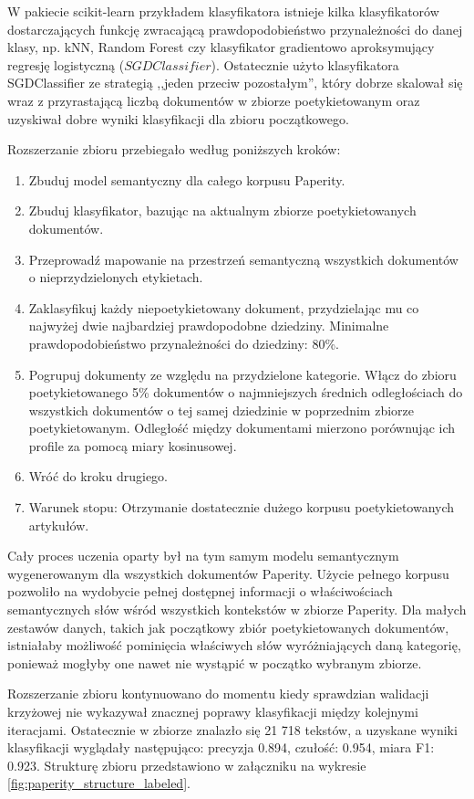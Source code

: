 \documentclass{pracamgr}
\begin{document}
W pakiecie scikit-learn przykładem klasyfikatora istnieje kilka klasyfikatorów dostarczających funkcję zwracającą prawdopodobieństwo przynależności do danej klasy, np. kNN, Random Forest czy klasyfikator gradientowo aproksymujący regresję logistyczną ($SGDClassifier$). Ostatecznie użyto klasyfikatora SGDClassifier ze strategią ,,jeden przeciw pozostałym'', który dobrze skalował się wraz z przyrastającą liczbą dokumentów w zbiorze poetykietowanym oraz uzyskiwał dobre wyniki klasyfikacji dla zbioru początkowego. 

Rozszerzanie zbioru przebiegało według poniższych kroków:

\begin{enumerate}
    \item Zbuduj model semantyczny dla całego korpusu Paperity.
    \item Zbuduj klasyfikator, bazując na aktualnym zbiorze poetykietowanych dokumentów.
    \item Przeprowadź mapowanie na przestrzeń semantyczną wszystkich dokumentów o nieprzydzielonych etykietach.
    \item Zaklasyfikuj każdy niepoetykietowany dokument, przydzielając mu co najwyżej dwie najbardziej prawdopodobne dziedziny. Minimalne prawdopodobieństwo przynależności do dziedziny: 80\%.
    \item Pogrupuj dokumenty ze względu na przydzielone kategorie. Włącz do zbioru poetykietowanego 5\% dokumentów o najmniejszych średnich odległościach do wszystkich dokumentów o tej samej dziedzinie w poprzednim zbiorze poetykietowanym. Odległość między dokumentami mierzono porównując ich profile za pomocą miary kosinusowej.
    \item Wróć do kroku drugiego.
    \item Warunek stopu: Otrzymanie dostatecznie dużego korpusu poetykietowanych artykułów.
\end{enumerate}

Cały proces uczenia oparty był na tym samym modelu semantycznym wygenerowanym dla wszystkich dokumentów Paperity. Użycie pełnego korpusu pozwoliło na wydobycie pełnej dostępnej informacji o właściwościach semantycznych słów wśród wszystkich kontekstów w zbiorze Paperity. Dla małych zestawów danych, takich jak początkowy zbiór poetykietowanych dokumentów, istniałaby możliwość pominięcia właściwych słów wyróżniających daną kategorię, ponieważ mogłyby one nawet nie wystąpić w początko wybranym zbiorze.

Rozszerzanie zbioru kontynuowano do momentu kiedy sprawdzian walidacji krzyżowej nie wykazywał znacznej poprawy klasyfikacji między kolejnymi iteracjami. Ostatecznie w zbiorze znalazło się 21 718 tekstów, a uzyskane wyniki klasyfikacji wyglądały następująco: precyzja 0.894,	czułość: 0.954, miara F1: 0.923. Strukturę zbioru przedstawiono w załączniku na wykresie \ref{fig:paperity_structure_labeled}.
\end{document}
